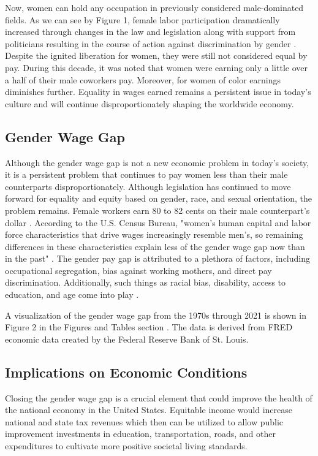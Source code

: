 \documentclass[12pt, English]{article}
\begin{document}
Now, women can hold any occupation in previously considered male-dominated fields. As we can see by Figure 1, female labor participation dramatically increased through changes in the law and legislation along with support from politicians resulting in the course of action against discrimination by gender \citep{USBureauofLaborStatistics1}. Despite the ignited liberation for women, they were still not considered equal by pay. During this decade, it was noted that women were earning only a little over a half of their male coworkers pay. Moreover, for women of color earnings diminishes further. Equality in wages earned remains a persistent issue in today's culture and will continue disproportionately shaping the worldwide economy. 

\subsection*{Gender Wage Gap}
Although the gender wage gap is not a new economic problem in today's society, it is a persistent problem that continues to pay women less than their male counterparts disproportionately. Although legislation has continued to move forward for equality and equity based on gender, race, and sexual orientation, the problem remains. Female workers earn 80 to 82 cents on their male counterpart's dollar \citep{bureau_2021}. According to the U.S. Census Bureau, "women's human capital and labor force characteristics that drive wages increasingly resemble men's, so remaining differences in these characteristics explain less of the gender wage gap now than in the past" \cite{bureau_2021}. The gender pay gap is attributed to a plethora of factors, including occupational segregation, bias against working mothers, and direct pay discrimination. Additionally, such things as racial bias, disability, access to education, and age come into play \citep{AAUW}.

A visualization of the gender wage gap from the 1970s through 2021 is shown in Figure 2 in the Figures and Tables section \citep{USBureauofLaborStatistics2}. The data is derived from FRED economic data created by the Federal Reserve Bank of St. Louis. 

\subsection*{Implications on Economic Conditions}
Closing the gender wage gap is a crucial element that could improve the health of the national economy in the United States. Equitable income would increase national and state tax revenues which then can be utilized to allow public improvement investments in education, transportation, roads, and other expenditures to cultivate more positive societal living standards. 
\end{document}
